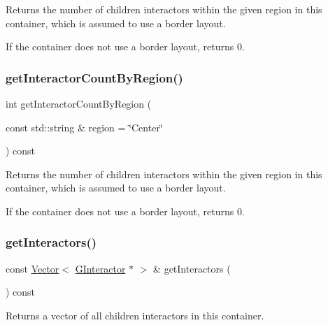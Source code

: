 Returns the number of children interactors within the given region in this container, which is assumed to use a border layout. 

If the container does not use a border layout, returns 0. \mbox{\label{classGContainer_ab51dbb723159efca4fc89e2c4211610c}} 
\subsubsection{\texorpdfstring{get\+Interactor\+Count\+By\+Region()}{getInteractorCountByRegion()}\hspace{0.1cm}{\footnotesize\ttfamily [2/2]}}
{\footnotesize\ttfamily int get\+Interactor\+Count\+By\+Region (\begin{DoxyParamCaption}\item[{const std\+::string \&}]{region = {\ttfamily \char`\"{}Center\char`\"{}} }\end{DoxyParamCaption}) const\hspace{0.3cm}{\ttfamily [virtual]}}



Returns the number of children interactors within the given region in this container, which is assumed to use a border layout. 

If the container does not use a border layout, returns 0. \mbox{\label{classGContainer_a3f9ba3028f69581c7de79c9c03f39a2e}} 
\subsubsection{\texorpdfstring{get\+Interactors()}{getInteractors()}}
{\footnotesize\ttfamily const \mbox{\hyperlink{classVector}{Vector}}$<$ \mbox{\hyperlink{classGInteractor}{G\+Interactor}} $\ast$ $>$ \& get\+Interactors (\begin{DoxyParamCaption}{ }\end{DoxyParamCaption}) const\hspace{0.3cm}{\ttfamily [virtual]}}



Returns a vector of all children interactors in this container. 

